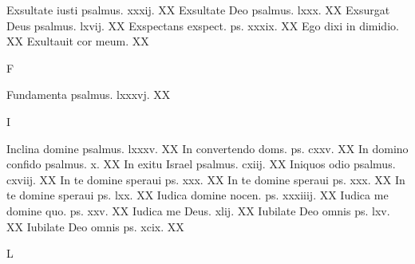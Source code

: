 \documentclass[a5paper,10pt]{book}
\begin{document}
\begin{multicols}{2}
\newline Exsultate iusti psalmus. xxxij. \hfill XX
\newline Exsultate Deo psalmus. lxxx. \hfill XX
\newline Exsurgat Deus psalmus. lxvij. \hfill XX
\newline Exspectans exspect. ps. xxxix. \hfill XX
\newline Ego dixi in dimidio. \hfill XX
\newline Exultauit cor meum. \hfill XX
\newline \vspace{-1.75em}
\begin{center}
\color{red} F
\end{center}
\vspace{-.75em}
\par \noindent Fundamenta psalmus. lxxxvj. \hfill XX
\newline \vspace{-1.75em}
\begin{center}
\color{red} I
\end{center}
\vspace{-.75em}
\par \noindent Inclina domine psalmus. lxxxv. \hfill XX
\newline In convertendo doms. ps. cxxv. \hfill XX
\newline In domino confido psalmus. x. \hfill XX
\newline In exitu Israel psalmus. cxiij. \hfill XX
\newline Iniquos odio psalmus. cxviij. \hfill XX
\newline In te domine speraui ps. xxx. \hfill XX
\newline In te domine speraui ps. xxx. \hfill XX
\newline In te domine speraui ps. lxx. \hfill XX
\newline Iudica domine nocen. ps. xxxiiij. \hfill XX
\newline Iudica me domine quo. ps. xxv. \hfill XX
\newline Iudica me Deus. xlij. \hfill XX
\newline Iubilate Deo omnis ps. lxv. \hfill XX
\newline Iubilate Deo omnis ps. xcix. \hfill XX
\newline \vspace{-1.75em}
\begin{center}
\color{red} L
\end{center}
\vspace{-.75em}

\end{multicols}
\end{document}
